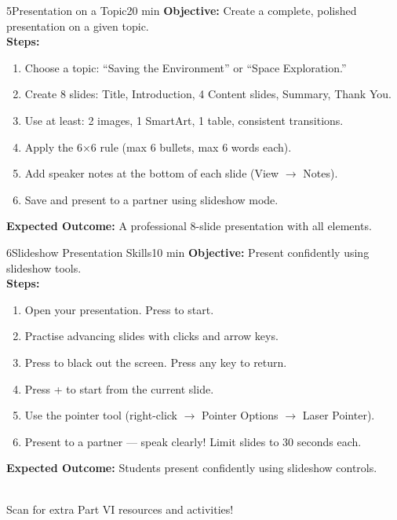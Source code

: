 \begin{labactivity}{5}{Presentation on a Topic}{20 min}
\textbf{Objective:} Create a complete, polished presentation on a given topic.\\[4pt]
\textbf{Steps:}
\begin{enumerate}[label=\protect\stepcircle{\arabic*}, leftmargin=2cm, itemsep=4pt]
  \item Choose a topic: ``Saving the Environment'' or ``Space Exploration.''
  \item Create 8 slides: Title, Introduction, 4 Content slides, Summary, Thank You.
  \item Use at least: 2 images, 1 SmartArt, 1 table, consistent transitions.
  \item Apply the 6×6 rule (max 6 bullets, max 6 words each).
  \item Add speaker notes at the bottom of each slide (View $\rightarrow$ Notes).
  \item Save and present to a partner using slideshow mode.
\end{enumerate}
\textbf{Expected Outcome:} A professional 8-slide presentation with all elements.
\welldone
\end{labactivity}

\begin{labactivity}{6}{Slideshow Presentation Skills}{10 min}
\textbf{Objective:} Present confidently using slideshow tools.\\[4pt]
\textbf{Steps:}
\begin{enumerate}[label=\protect\stepcircle{\arabic*}, leftmargin=2cm, itemsep=4pt]
  \item Open your presentation. Press  to start.
  \item Practise advancing slides with clicks and arrow keys.
  \item Press  to black out the screen. Press any key to return.
  \item Press + to start from the current slide.
  \item Use the pointer tool (right-click $\rightarrow$ Pointer Options $\rightarrow$ Laser Pointer).
  \item Present to a partner --- speak clearly! Limit slides to 30 seconds each.
\end{enumerate}
\textbf{Expected Outcome:} Students present confidently using slideshow controls.
\welldone
\end{labactivity}

\vspace{12pt}
\begin{center}
  \\[6pt]
  {\small\sffamily\textcolor{NavyBlue}{Scan for extra Part VI resources and activities!}}
\end{center}

